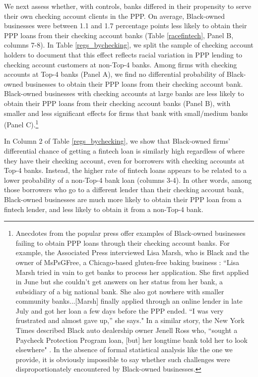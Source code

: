 \documentclass[11pt]{article}
\begin{document}
We next assess whether, with controls, banks differed in their propensity to serve their own checking account clients in the PPP. On average, Black-owned businesses were between 1.1 and 1.7 percentage points less likely to obtain their PPP loans from their checking account banks (Table \ref{racefintech}, Panel B,  columns 7-8). In Table \ref{regs_bychecking}, we split the sample of checking account holders to document that this effect reflects racial variation in PPP lending to checking account customers at non-Top-4 banks. Among firms with checking accounts at Top-4 banks (Panel A), we find no differential probability of Black-owned businesses to obtain their PPP loans from their checking account bank. Black-owned businesses with checking accounts at large banks are less likely to obtain their PPP loans from their checking account banks (Panel B), with smaller and less significant effects for firms that bank with small/medium banks (Panel C).\footnote{Anecdotes from the popular press offer examples of Black-owned businesses failing to obtain PPP loans through their checking account banks. For example, the Associated Press interviewed Lisa Marsh, who is Black and the owner of MsPsGFree, a Chicago-based gluten-free baking business \citep{ap_ppp}: ``Lisa Marsh tried in vain to get banks to process her application. She first applied in June but she couldn’t get answers on her status from her bank, a subsidiary of a big national bank. She also got nowhere with smaller community banks...[Marsh] finally applied through an online lender in late July and got her loan a few days before the PPP ended. “I was very frustrated and almost gave up,” she says." In a similar story, the New York Times described Black auto dealership owner Jenell Ross who, ``sought a Paycheck Protection Program loan, [but] her longtime bank told her to look elsewhere"  \citep{nytmin}. In the absence of formal statistical analysis like the one we provide, it is obviously impossible to say whether such challenges were disproportionately encountered by Black-owned businesses.} 

In Column 2 of Table \ref{regs_bychecking}, we show that Black-owned firms' differential chance of getting a fintech loan is similarly high regardless of where they have their checking account, even for borrowers with checking accounts at Top-4 banks. Instead, the higher rate of fintech loans appears to be related to a lower probability of a non-Top-4 bank loan (columns 3-4). In other words, among those borrowers  who go to a different lender than their checking account bank, Black-owned businesses are much more likely to obtain their PPP loan from a fintech lender, and less likely to obtain it from a non-Top-4 bank.
	
\end{document}
